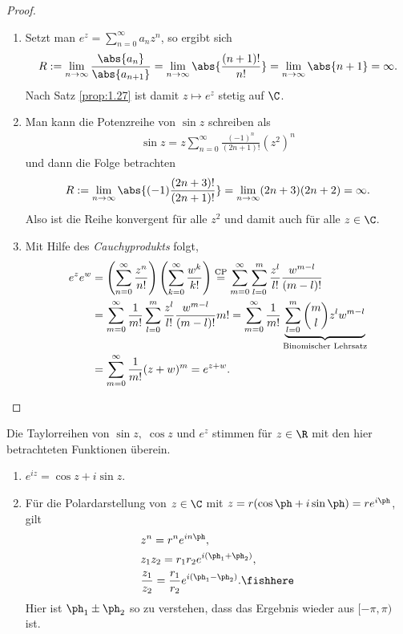 \begin{proof}
\begin{enumerate}
  \item Setzt man $e^z = \sum\limits_{n=0}^\infty a_n z^n$, so ergibt sich
\begin{align*}
R:=
\lim\limits_{n\to\infty}\frac{\abs{a_n}}{\abs{a_{n+1}}}
= \lim\limits_{n\to\infty}\abs{\frac{(n+1)!}{n!}}
=\lim\limits_{n\to\infty}\abs{n+1} = \infty.
\end{align*}
Nach Satz \ref{prop:1.27} ist damit $z\mapsto e^z$ stetig auf $\C$.
\item Man kann die Potenzreihe von $\sin z$ schreiben als
\begin{align*}
\sin z = z\sum\limits_{n=0}^\infty \frac{(-1)^n}{(2n+1)!}(z^2)^n
\end{align*}
und dann die Folge betrachten
\begin{align*}
R:=\lim\limits_{n\to\infty} \abs{(-1)\frac{(2n+3)!}{(2n+1)!}}
= \lim\limits_{n\to\infty} (2n+3)(2n+2) = \infty.
\end{align*}
Also ist die Reihe konvergent für alle $z^2$ und damit auch für alle $z\in\C$.
\item  Mit Hilfe des \emph{Cauchyprodukts} folgt,
\begin{align*}
e^ze^w &= \left(\sum\limits_{n=0}^\infty \frac{z^n}{n!} \right)
\left(\sum\limits_{k=0}^\infty \frac{w^k}{k!} \right)
\overset{\text{CP}}{=} \sum\limits_{m=0}^\infty\sum\limits_{l=0}^m
\frac{z^l}{l!}\frac{w^{m-l}}{(m-l)!}
\\ &= \sum\limits_{m=0}^\infty \frac{1}{m!} \sum\limits_{l=0}^m
\frac{z^l}{l!}\frac{w^{m-l}}{(m-l)!}m! = \sum\limits_{m=0}^\infty \frac{1}{m!}
\underbrace{\sum\limits_{l=0}^m {m \choose l} z^lw^{m-l}}_{\text{Binomischer
Lehrsatz}}\\ &= \sum\limits_{m=0}^\infty \frac{1}{m!}(z+w)^m = e^{z+w}.\qedhere
\end{align*}
\end{enumerate}
\end{proof}

\begin{bem}
\label{bem:2.9}
Die Taylorreihen von $\sin z,\;\cos z$ und $e^z$ stimmen für $z\in\R$ mit den
hier betrachteten Funktionen überein.\maphere
\end{bem}

\begin{cor}
\label{prop:2.10}
\begin{enumerate}
\item
$e^{iz} = \cos z + i\sin z$.
\item
Für die Polardarstellung von $z\in\C$ mit $z = r(\cos\ph+i\sin\ph) =
re^{i\ph}$, gilt
\begin{align*}
&z^n = r^ne^{in\ph},\\
&z_1z_2 = r_1r_2e^{i(\ph_1+\ph_2)},\\
&\frac{z_1}{z_2} = \frac{r_1}{r_2}e^{i(\ph_1-\ph_2)}.\fishhere
\end{align*}
Hier ist $\ph_1\pm\ph_2$ so zu verstehen, dass das Ergebnis wieder aus
$[-\pi,\pi)$ ist.\fishhere
\end{enumerate}
\end{cor}

